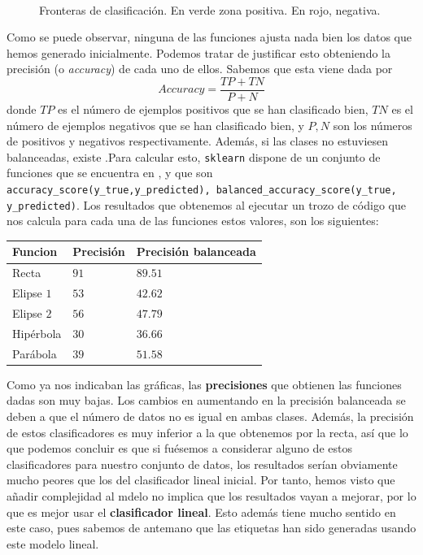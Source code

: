 \documentclass[12pt]{article}
\begin{document}
{\begin{figure}[H]
  \centering
  \qquad
  \\
  \qquad%
  \caption{Fronteras de clasificación. En verde zona positiva. En rojo, negativa.}
  \label{fig:myfig}
\end{figure}

Como se puede observar, ninguna de las funciones ajusta nada bien los datos que hemos generado inicialmente. Podemos tratar de justificar esto obteniendo la precisión (o \emph{accuracy}) de cada uno de ellos. Sabemos que esta viene dada por 
$$
Accuracy = \frac{TP + TN}{P + N}
$$
donde $TP$ es el número de ejemplos positivos que se han clasificado bien, $TN$ es el número de ejemplos negativos que se han clasificado bien, y $P,N$ son los números de positivos y negativos respectivamente. Además, si las clases no estuviesen balanceadas, existe .Para calcular esto, \lstinline{sklearn} dispone de un conjunto de funciones que se encuentra en , y que son \lstinline{accuracy_score(y_true,y_predicted), balanced_accuracy_score(y_true, y_predicted)}. Los resultados que obtenemos al ejecutar un trozo de código que nos calcula para cada una de las funciones estos valores, son los siguientes:

\begin{table}[H]
  \centering
  \begin{tabular}{|l|l|l|}
  \hline
  Funcion    & Precisión & Precisión balanceada \\ \hline
  Recta      & $91$      & $89.51$              \\ \hline
  Elipse $1$ & $53$      & $42.62$              \\ \hline
  Elipse $2$ & $56$      & $47.79$              \\ \hline
  Hipérbola  & $30$      & $36.66$              \\ \hline
  Parábola   & $39$      & $51.58$              \\ \hline
  \end{tabular}
  \end{table}


Como ya nos indicaban las gráficas, las \textbf{precisiones} que obtienen las funciones dadas son muy bajas. Los cambios en aumentando en la precisión balanceada se deben a que el número de datos no es igual en ambas clases. Además, la precisión de estos clasificadores es muy inferior a la que obtenemos por la recta, así que lo que podemos concluir es que si fuésemos a considerar alguno de estos clasificadores para nuestro conjunto de datos, los resultados serían obviamente mucho peores que los del clasificador lineal inicial. Por tanto, hemos visto que añadir complejidad al mdelo no implica que los resultados vayan a mejorar, por lo que es mejor usar el \textbf{clasificador lineal}. Esto además tiene mucho sentido en este caso, pues sabemos de antemano que las etiquetas han sido generadas usando este modelo lineal.

}
\end{document}
